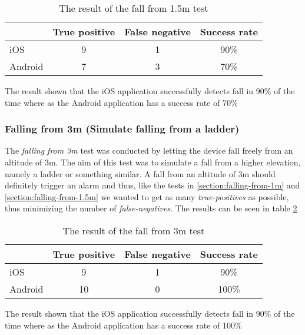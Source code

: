 \documentclass[12pt, a4paper, onecolumn]{article}
\begin{document}
				\begin{table}[H]
			\centering
			\begin{tabular}{|l|c|c|c|}
				\hline
				& True positive & False negative & Success rate \\ \hline
				iOS     & 9            & 1             & 90\%        \\ \hline
				Android & 7            & 3              & 70\%        \\ \hline
			\end{tabular}
			\caption{The result of the fall from 1.5m test}
			\label{table:fall-from-1.5m}
		\end{table}
	
		The result shown that the iOS application successfully detects fall in 90\% of the time where as the Android application has a success rate of 70\%
		
		
		\subsubsection{Falling from 3m (Simulate falling from a ladder)}
		The \textit{falling from 3m} test was conducted by letting the device fall freely from an altitude of 3m. The aim of this test was to simulate a fall from a higher elevation, namely a ladder or something similar. A fall from an altitude of 3m should definitely trigger an alarm and thus, like the tests in \ref{section:falling-from-1m} and \ref{section:falling-from-1.5m} we wanted to get as many \textit{true-positives} as possible, thus minimizing the number of \textit{false-negatives}. The results can be seen in table \ref{table:fall-from-3m}
		
		\begin{table}[H]
			\centering
			\begin{tabular}{|l|c|c|c|}
				\hline
				& True positive & False negative & Success rate \\ \hline
				iOS     & 9            & 1             & 90\%        \\ \hline
				Android & 10           & 0             & 100\%        \\ \hline
			\end{tabular}
			\caption{The result of the fall from 3m test}
			\label{table:fall-from-3m}
		\end{table}
	
			The result shown that the iOS application successfully detects fall in 90\% of the time where as the Android application has a success rate of 100\%
			
\end{document}
